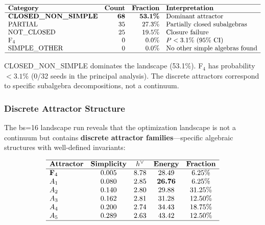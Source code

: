 \begin{equation}
\begin{array}{lrrl}
\hline
\textbf{Category} & \textbf{Count} & \textbf{Fraction} & \textbf{Interpretation} \\
\hline
\textbf{CLOSED\_NON\_SIMPLE} & \textbf{68} & \textbf{53.1\%} & \text{Dominant attractor} \\
\text{PARTIAL} & 35 & 27.3\% & \text{Partially closed subalgebras} \\
\text{NOT\_CLOSED} & 25 & 19.5\% & \text{Closure failure} \\
\text{F}_4 & 0 & 0.0\% & P < 3.1\% \text{ (95\% CI)} \\
\text{SIMPLE\_OTHER} & 0 & 0.0\% & \text{No other simple algebras found} \\
\hline
\end{array}
\end{equation}

CLOSED\_NON\_SIMPLE dominates the landscape (53.1\%). F$_4$ has probability $< 3.1\%$ (0/32 seeds in the principal analysis). The discrete attractors correspond to specific subalgebra decompositions, not a continuum.

\subsubsection{Discrete Attractor Structure}

The bs=16 landscape run reveals that the optimization landscape is not a continuum but contains \textbf{discrete attractor families}---specific algebraic structures with well-defined invariants:

\begin{equation}
\begin{array}{lccccc}
\hline
\textbf{Attractor} & \textbf{Simplicity} & \textbf{$h^\vee$} & \textbf{Energy} & \textbf{Fraction} \\
\hline
\textbf{F}_4 & 0.005 & 8.78 & 28.49 & 6.25\% \\
A_1 & 0.080 & 2.85 & \textbf{26.76} & 6.25\% \\
A_2 & 0.140 & 2.80 & 29.88 & 31.25\% \\
A_3 & 0.162 & 2.81 & 31.28 & 12.50\% \\
A_4 & 0.200 & 2.74 & 34.43 & 18.75\% \\
A_5 & 0.289 & 2.63 & 43.42 & 12.50\% \\
\hline
\end{array}
\end{equation}

